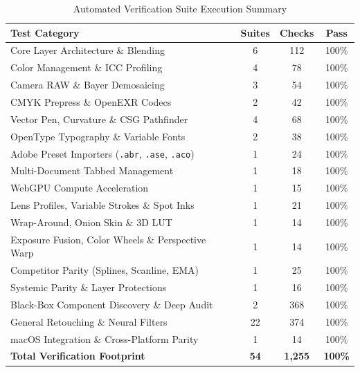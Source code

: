\documentclass[10pt,journal,compsoc]{IEEEtran}
\begin{document}
\begin{table}[!t]
\centering
\caption{Automated Verification Suite Execution Summary}
\label{tab:test_summary}
\footnotesize
\begin{tabularx}{\columnwidth}{@{}>{\raggedright\arraybackslash}Xccc@{}}
\toprule
\textbf{Test Category} & \textbf{Suites} & \textbf{Checks} & \textbf{Pass} \\
\midrule
Core Layer Architecture \& Blending & 6 & 112 & 100\% \\
Color Management \& ICC Profiling & 4 & 78 & 100\% \\
Camera RAW \& Bayer Demosaicing & 3 & 54 & 100\% \\
CMYK Prepress \& OpenEXR Codecs & 2 & 42 & 100\% \\
Vector Pen, Curvature \& CSG Pathfinder & 4 & 68 & 100\% \\
OpenType Typography \& Variable Fonts & 2 & 38 & 100\% \\
Adobe Preset Importers (\texttt{.abr}, \texttt{.ase}, \texttt{.aco}) & 1 & 24 & 100\% \\
Multi-Document Tabbed Management & 1 & 18 & 100\% \\
WebGPU Compute Acceleration & 1 & 15 & 100\% \\
Lens Profiles, Variable Strokes \& Spot Inks & 1 & 21 & 100\% \\
Wrap-Around, Onion Skin \& 3D LUT & 1 & 14 & 100\% \\
Exposure Fusion, Color Wheels \& Perspective Warp & 1 & 14 & 100\% \\
Competitor Parity (Splines, Scanline, EMA) & 1 & 25 & 100\% \\
Systemic Parity \& Layer Protections & 1 & 16 & 100\% \\
Black-Box Component Discovery \& Deep Audit & 2 & 368 & 100\% \\
General Retouching \& Neural Filters & 22 & 374 & 100\% \\
macOS Integration \& Cross-Platform Parity & 1 & 14 & 100\% \\
\midrule
\textbf{Total Verification Footprint} & \textbf{54} & \textbf{1,255} & \textbf{100\%} \\
\bottomrule
\end{tabularx}
\end{table}
\end{document}
